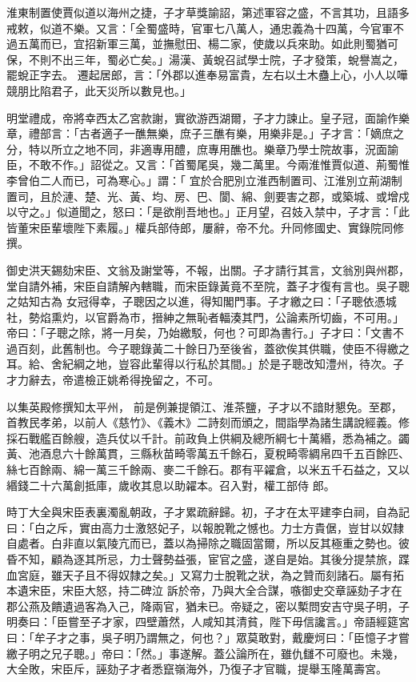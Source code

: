 \begin{pinyinscope}
 淮東制置使賈似道以海州之捷，子才草獎諭詔，第述軍容之盛，不言其功，且語多戒敕，似道不樂。又言：「全蜀盛時，官軍七八萬人，通忠義為十四萬，今官軍不過五萬而已，宜招新軍三萬，並撫慰田、楊二家，使歲以兵來助。如此則蜀猶可保，不則不出三年，蜀必亡矣。」湯漢、黃蛻召試學士院，子才發策，蛻譽嵩之，罷蛻正字去。
 遷起居郎，言：「外郡以進奉易富貴，左右以土木蠱上心，小人以嘩競朋比陷君子，此天災所以數見也。」



 明堂禮成，帝將幸西太乙宮款謝，實欲游西湖爾，子才力諫止。皇子冠，面諭作樂章，禮部言：「古者適子一醮無樂，庶子三醮有樂，用樂非是。」子才言：「嫡庶之分，特以所立之地不同，非適專用醴，庶專用醮也。樂章乃學士院故事，況面諭臣，不敢不作。」詔從之。又言：「首蜀尾吳，幾二萬里。今兩淮惟賈似道、荊蜀惟李曾伯二人而已，可為寒心。」謂：「
 宜於合肥別立淮西制置司、江淮別立荊湖制置司，且於漣、楚、光、黃、均、房、巴、閬、綿、劍要害之郡，或築城、或增戍以守之。」似道聞之，怒曰：「是欲削吾地也。」正月望，召妓入禁中，子才言：「此皆董宋臣輩壞陛下素履。」權兵部侍郎，屢辭，帝不允。升同修國史、實錄院同修撰。



 御史洪天錫劾宋臣、文翁及謝堂等，不報，出關。子才請行其言，文翁別與州郡，堂自請外補，宋臣自請解內轄職，而宋臣錄黃竟不至院，蓋子才復有言也。吳子聰之姑知古為
 女冠得幸，子聰因之以進，得知閣門事。子才繳之曰：「子聰依憑城社，勢焰熏灼，以官爵為市，搢紳之無恥者輻湊其門，公論素所切齒，不可用。」帝曰：「子聰之除，將一月矣，乃始繳駁，何也？可即為書行。」子才曰：「文書不過百刻，此舊制也。今子聰錄黃二十餘日乃至後省，蓋欲俟其供職，使臣不得繳之耳。給、舍紀綱之地，豈容此輩得以行私於其間。」於是子聰改知澧州，待次。子才力辭去，帝遣檢正姚希得挽留之，不可。



 以集英殿修撰知太平州，
 前是例兼提領江、淮茶鹽，子才以不諳財懇免。至郡，首教民孝弟，以前人《慈竹》、《義木》二詩刻而頒之，間詣學為諸生講說經義。修採石戰艦百餘艘，造兵仗以千計。前政負上供綱及總所綱七十萬緡，悉為補之。蠲黃、池酒息六十餘萬貫，三縣秋苗畸零萬五千餘石，夏稅畸零綢帛四千五百餘匹、絲七百餘兩、綿一萬三千餘兩、麥二千餘石。郡有平糴倉，以米五千石益之，又以緡錢二十六萬創抵庫，歲收其息以助糴本。召入對，權工部侍
 郎。



 時丁大全與宋臣表裏濁亂朝政，子才累疏辭歸。初，子才在太平建李白祠，自為記曰：「白之斥，實由高力士激怒妃子，以報脫靴之憾也。力士方貴倨，豈甘以奴隸自處者。白非直以氣陵亢而已，蓋以為掃除之職固當爾，所以反其極重之勢也。彼昏不知，顧為逐其所忌，力士聲勢益張，宦官之盛，遂自是始。其後分提禁旅，蹀血宮庭，雖天子且不得奴隸之矣。」又寫力士脫靴之狀，為之贊而刻諸石。屬有拓本遺宋臣，宋臣大怒，持二碑泣
 訴於帝，乃與大全合謀，嗾御史交章誣劾子才在郡公燕及饋遺過客為入己，降兩官，猶未已。帝疑之，密以槧問安吉守吳子明，子明奏曰：「臣嘗至子才家，四壁蕭然，人咸知其清貧，陛下毋信讒言。」帝語經筵宮曰：「牟子才之事，吳子明乃謂無之，何也？」眾莫敢對，戴慶炣曰：「臣憶子才嘗繳子明之兄子聰。」帝曰：「然。」事遂解。蓋公論所在，雖仇讎不可廢也。未幾，大全敗，宋臣斥，誣劾子才者悉竄嶺海外，乃復子才官職，提舉玉隆萬壽宮。




\end{pinyinscope}
